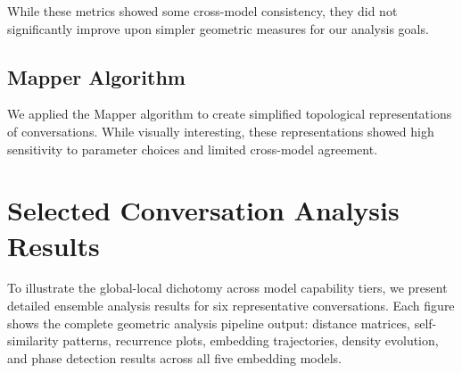 \documentclass[11pt,letterpaper]{article}
\begin{document}
While these metrics showed some cross-model consistency, they did not significantly improve upon simpler geometric measures for our analysis goals.

\subsection{Mapper Algorithm}

We applied the Mapper algorithm to create simplified topological representations of conversations. While visually interesting, these representations showed high sensitivity to parameter choices and limited cross-model agreement.

\section{Selected Conversation Analysis Results}

To illustrate the global-local dichotomy across model capability tiers, we present detailed ensemble analysis results for six representative conversations. Each figure shows the complete geometric analysis pipeline output: distance matrices, self-similarity patterns, recurrence plots, embedding trajectories, density evolution, and phase detection results across all five embedding models.

\afterpage{%
\clearpage
\thispagestyle{empty}

}

\afterpage{%
\clearpage
\thispagestyle{empty}

}

\afterpage{%
\clearpage
\thispagestyle{empty}

}

\afterpage{%
\clearpage
\thispagestyle{empty}

}

\afterpage{%
\clearpage
\thispagestyle{empty}

}

\afterpage{%
\clearpage
\thispagestyle{empty}

}
\end{document}
